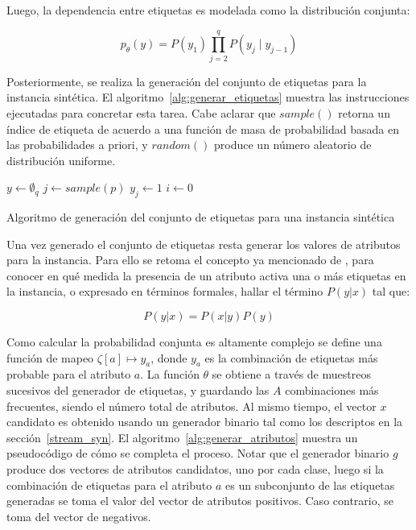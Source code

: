 Luego, la dependencia entre etiquetas es modelada como la distribución conjunta:

\begin{equation}
	\label{eq:syn_joint}
	p_{\theta}(y) = P(y_{1}) \prod_{j=2}^q P(y_{j} \mid y_{j-1})
\end{equation}

Posteriormente, se realiza la generación del conjunto de etiquetas para la
instancia sintética. El algoritmo~\ref{alg:generar_etiquetas} muestra las
instrucciones ejecutadas para concretar esta tarea. Cabe aclarar que $sample()$
retorna un índice de etiqueta de acuerdo a una función de masa de probabilidad
basada en las probabilidades a priori, y $random()$ produce un número aleatorio
de distribución uniforme.

\begin{center}
	\begin{algorithm}[H]
		\label{alg:generar_etiquetas}
		\SetAlgoLined
		\DontPrintSemicolon
		$y \gets \emptyset_{q}$\;
		$j \gets sample(p)$\;
		$y_{j} \gets 1$\;
		$i \gets 0$ \;
		\caption{Algoritmo de generación del conjunto de etiquetas para una instancia
			sintética}
	\end{algorithm}
\end{center}

Una vez generado el conjunto de etiquetas resta generar los valores de atributos
para la instancia. Para ello se retoma el concepto ya mencionado de
, para conocer en qué medida la presencia de
un atributo activa una o más etiquetas en la instancia, o expresado en términos
formales, hallar el término $P(y|x)$ tal que:

\begin{equation}
	P(y|x) = P(x|y)P(y)
\end{equation}

Como calcular la probabilidad conjunta es altamente complejo se define una
función de mapeo $\zeta[a] \mapsto y_{a}$, donde $y_{a}$ es la combinación de
etiquetas más probable para el atributo $a$.  La función $\theta$ se obtiene a
través de muestreos sucesivos del generador de etiquetas, y guardando las $A$
combinaciones más frecuentes, siendo el número total de atributos. Al mismo
tiempo, el vector $x$ candidato es obtenido usando un generador binario tal como
los descriptos en la sección~\ref{stream_syn}. El
algoritmo~\ref{alg:generar_atributos} muestra un pseudocódigo de cómo se
completa el proceso. Notar que el generador binario $g$ produce dos vectores de
atributos candidatos, uno por cada clase, luego si la combinación de etiquetas
para el atributo $a$ es un subconjunto de las etiquetas generadas se toma el
valor del vector de atributos positivos. Caso contrario, se toma del vector de
negativos.

